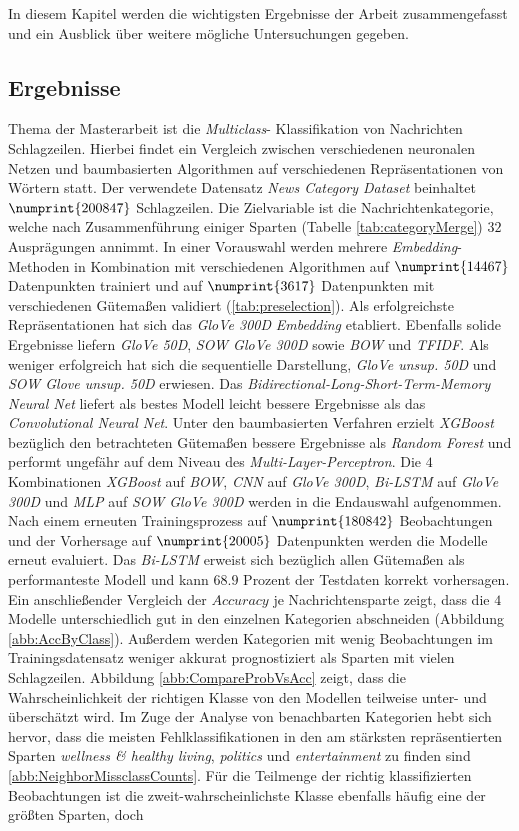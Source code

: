 \documentclass[a4paper,11pt]{article}
\begin{document}
In diesem Kapitel werden die wichtigsten Ergebnisse der Arbeit zusammengefasst und ein Ausblick über weitere mögliche Untersuchungen gegeben.

\subsection{Ergebnisse}

Thema der Masterarbeit ist die \textit{Multiclass}- Klassifikation von Nachrichten Schlagzeilen. Hierbei findet ein Vergleich zwischen verschiedenen neuronalen Netzen und baumbasierten Algorithmen auf verschiedenen Repräsentationen von Wörtern statt. Der verwendete Datensatz \textit{News Category Dataset} beinhaltet $\numprint{200847}$ Schlagzeilen. Die Zielvariable ist die Nachrichtenkategorie, welche nach Zusammenführung einiger Sparten (Tabelle \ref{tab:categoryMerge}) $32$ Ausprägungen annimmt. In einer Vorauswahl werden mehrere \textit{Embedding}-Methoden in Kombination mit verschiedenen Algorithmen auf $\numprint{14467}$ Datenpunkten trainiert und auf $\numprint{3617}$ Datenpunkten mit verschiedenen Gütemaßen validiert (\ref{tab:preselection}). Als erfolgreichste Repräsentationen hat sich das \textit{GloVe 300D} \textit{Embedding} etabliert. Ebenfalls solide Ergebnisse liefern \textit{GloVe 50D}, \textit{SOW GloVe 300D} sowie \textit{BOW} und \textit{TFIDF}. Als weniger erfolgreich hat sich die sequentielle Darstellung, \textit{GloVe unsup. 50D} und \textit{SOW Glove unsup. 50D} erwiesen. Das \textit{Bidirectional-Long-Short-Term-Memory Neural Net} liefert als bestes Modell leicht bessere Ergebnisse als das \textit{Convolutional Neural Net}. Unter den baumbasierten Verfahren erzielt \textit{XGBoost} bezüglich den betrachteten Gütemaßen bessere Ergebnisse als \textit{Random Forest} und performt ungefähr auf dem Niveau des \textit{Multi-Layer-Perceptron}. Die $4$ Kombinationen \textit{XGBoost} auf \textit{BOW}, \textit{CNN} auf \textit{GloVe 300D}, \textit{Bi-LSTM} auf \textit{GloVe 300D} und \textit{MLP} auf \textit{SOW GloVe 300D} werden in die Endauswahl aufgenommen. Nach einem erneuten Trainingsprozess auf $\numprint{180842}$ Beobachtungen und der Vorhersage auf $\numprint{20005}$ Datenpunkten werden die Modelle erneut evaluiert. Das \textit{Bi-LSTM} erweist sich bezüglich allen Gütemaßen als performanteste Modell und kann $68.9$ Prozent der Testdaten korrekt vorhersagen. Ein anschließender Vergleich der $Accuracy$ je Nachrichtensparte zeigt, dass die $4$ Modelle unterschiedlich gut in den einzelnen Kategorien abschneiden (Abbildung \ref{abb:AccByClass}). Außerdem werden Kategorien mit wenig Beobachtungen im Trainingsdatensatz weniger akkurat prognostiziert als Sparten mit vielen Schlagzeilen. Abbildung \ref{abb:CompareProbVsAcc} zeigt, dass die Wahrscheinlichkeit der richtigen Klasse von den Modellen teilweise unter- und überschätzt wird. Im Zuge der Analyse von benachbarten Kategorien hebt sich hervor, dass die meisten Fehlklassifikationen in den am stärksten repräsentierten Sparten \textit{wellness \& healthy living}, \textit{politics} und \textit{entertainment} zu finden sind \ref{abb:NeighborMissclassCounts}. Für die Teilmenge der richtig klassifizierten Beobachtungen ist die zweit-wahrscheinlichste Klasse ebenfalls häufig eine der größten Sparten, doch 
\end{document}
